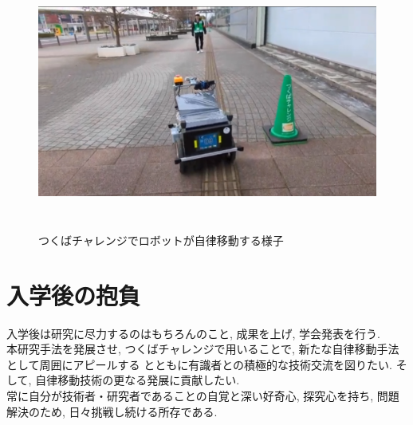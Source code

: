 \documentclass{jsarticle}
\begin{document}
\begin{figure}[h!]
  \centering
   \includegraphics[height=85mm]{./figs/tukuba.png}
   \caption{つくばチャレンジでロボットが自律移動する様子}
\end{figure}


\section{入学後の抱負}
入学後は研究に尽力するのはもちろんのこと, 成果を上げ, 学会発表を行う.\\
\hspace{1zw}本研究手法を発展させ, つくばチャレンジで用いることで, 新たな自律移動手法として周囲にアピールする
とともに有識者との積極的な技術交流を図りたい. そして, 自律移動技術の更なる発展に貢献したい.\\
\hspace{1zw}常に自分が技術者・研究者であることの自覚と深い好奇心, 探究心を持ち, 問題解決のため, 日々挑戦し続ける所存である.
\end{document}
